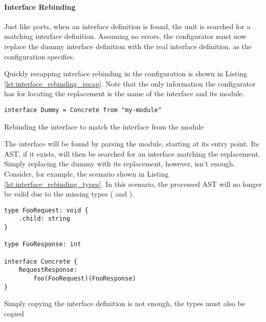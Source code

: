 \paragraph{Interface Rebinding}

Just like ports, when an interface definition is found, the  unit
is searched for a matching interface definition. Assuming no errors, the
configurator must now replace the dummy interface definition with the real
interface definition, as the configuration specifies.

Quickly recapping interface rebinding in the configuration is shown in Listing
\ref{lst:interface_rebinding_recap}. Note that the only information the
configurator has for locating the replacement is the name of the interface and
its module.

\begin{listing}[H]
\begin{verbatim}
interface Dummy = Concrete from "my-module"
\end{verbatim}

\caption{Rebinding the interface  to match the interface
     from the module }

\label{lst:interface_rebinding_recap}

\end{listing}

The interface will be found by parsing the module, starting at its entry point.
Its AST, if it exists, will then be searched for an interface matching the
replacement. Simply replacing the dummy with its replacement, however, isn't
enough. Consider, for example, the scenario shown in Listing
\ref{lst:interface_rebinding_types}. In this scenario, the processed AST will
no longer be valid due to the missing types ( and
).

\begin{listing}[H]
\begin{verbatim}
type FooRequest: void {
    .child: string
}

type FooResponse: int

interface Concrete {
    RequestResponse:
        foo(FooRequest)(FooResponse)
}
\end{verbatim}

\caption{Simply copying the interface definition is not enough, the types must
    also be copied}

\label{lst:interface_rebinding_types}
\end{listing}

